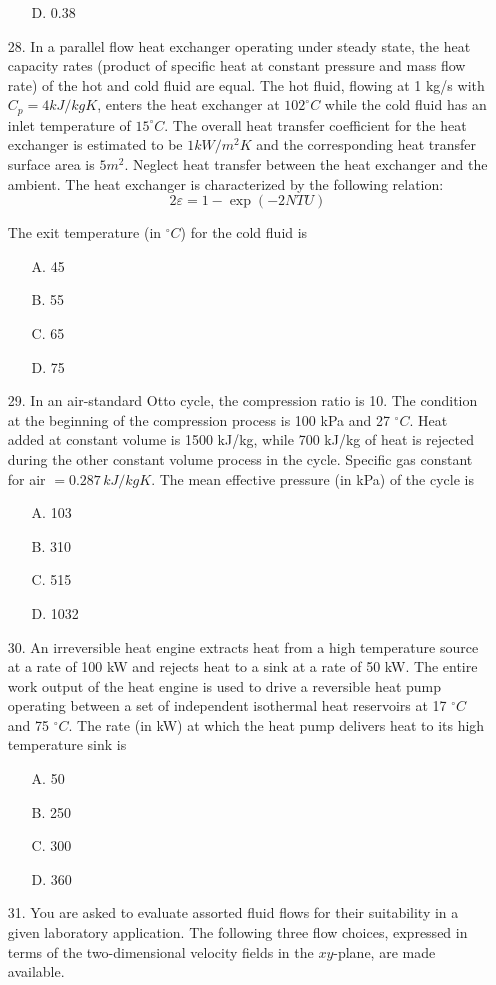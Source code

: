 \documentclass[journal]{IEEEtran}
\begin{document}
\begin{enumerate}
\begin{enumerate}
    \item [D.] 0.38
  \end{enumerate}
  \item[28.] In a parallel flow heat exchanger operating under steady state, the heat capacity rates (product of specific heat at constant pressure and mass flow rate) of the hot and cold fluid are equal. The hot fluid, flowing at 1 kg/s with $C_p = 4  kJ/kgK$, enters the heat exchanger at $102^\circ C$ while the cold fluid has an inlet temperature of $15^\circ C$. The overall heat transfer coefficient for the heat exchanger is estimated to be $1 kW/m^2K$ and the corresponding heat transfer surface area is $5 m^2$. Neglect heat transfer between the heat exchanger and the ambient. The heat exchanger is characterized by the following relation:
 $$ 2\varepsilon = 1 - \exp(-2 NTU) $$

 The exit temperature (in $^\circ C$) for the cold fluid is
  \begin{enumerate}
    \item [A.] 45
    \item [B.] 55
    \item [C.] 65
    \item [D.] 75
  \end{enumerate}
\item[29.] In an air-standard Otto cycle, the compression ratio is 10. The condition at the beginning of the compression process is 100 kPa and 27 $^\circ C$. Heat added at constant volume is 1500 kJ/kg, while 700 kJ/kg of heat is rejected during the other constant volume process in the cycle. Specific gas constant for air $= 0.287 \, kJ/kgK$. The mean effective pressure (in kPa) of the cycle is
\begin{enumerate}
    \item [A.] 103
    \item [B.] 310
    \item [C.] 515
    \item [D.] 1032
  \end{enumerate}
  \item[30.] An irreversible heat engine extracts heat from a high temperature source at a rate of 100 kW and rejects heat to a sink at a rate of 50 kW. The entire work output of the heat engine is used to drive a reversible heat pump operating between a set of independent isothermal heat reservoirs at 17 $^\circ C$ and 75 $^\circ C$. The rate (in kW) at which the heat pump delivers heat to its high temperature sink is
  \begin{enumerate}
    \item [A.] 50
    \item [B.] 250
    \item [C.] 300
    \item [D.] 360
  \end{enumerate}
  \item[31.] You are asked to evaluate assorted fluid flows for their suitability in a given laboratory application. The following three flow choices, expressed in terms of the two-dimensional velocity fields in the $xy$-plane, are made available.


\end{enumerate}
\end{document}
